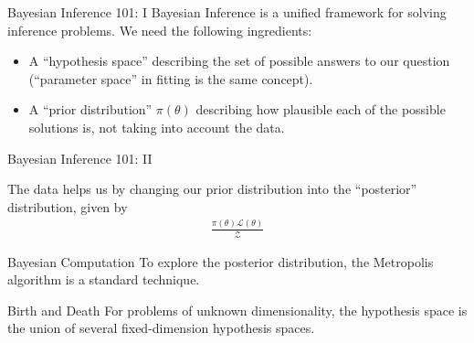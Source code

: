 \begin{frame}[t]{Bayesian Inference 101: I}
Bayesian Inference is a unified framework for solving inference problems.
We need the following ingredients:

\begin{itemize}
\item A ``hypothesis space'' describing the set of possible answers to our
question (``parameter space'' in fitting is the same concept).
\item A ``prior distribution'' $\pi\left(\theta\right)$ describing how plausible
each of the possible solutions is, not taking into account the data.
\end{itemize}

\end{frame}


\begin{frame}[t]{Bayesian Inference 101: II}

The data helps us by changing our prior distribution into the ``posterior''
distribution, given by
\begin{eqnarray}
\frac{\pi(\theta)\mathcal{L}(\theta)}{\mathcal{Z}}
\end{eqnarray}
\end{frame}


\begin{frame}[t]{Bayesian Computation}
To explore the posterior distribution, the Metropolis algorithm is a standard
technique.


\end{frame}

\begin{frame}[t]{Birth and Death}
For problems of unknown dimensionality, the hypothesis space is the union
of several fixed-dimension hypothesis spaces.


\end{frame}



